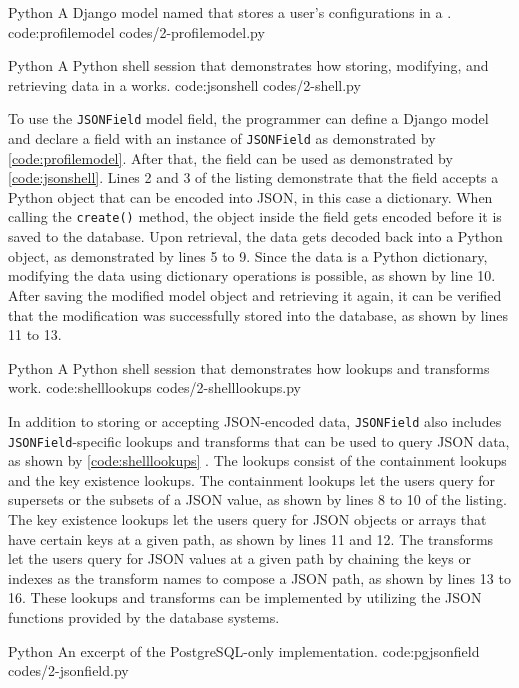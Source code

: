\listing
{Python}
{A Django model named  that stores a user's configurations in a
.}
{code:profilemodel}
{codes/2-profilemodel.py}

\listing
{Python}
{A Python shell session that demonstrates how storing, modifying, and
retrieving data in a  works.}
{code:jsonshell}
{codes/2-shell.py}

To use the \verb|JSONField| model field, the programmer can define a Django
model and declare a field with an instance of \verb|JSONField| as demonstrated
by \autoref{code:profilemodel}. After that, the field can be used as
demonstrated by \autoref{code:jsonshell}. Lines 2 and 3 of the listing
demonstrate that the field accepts a Python object that can be encoded into
JSON, in this case a dictionary. When calling the \verb|create()| method, the
object inside the field gets encoded before it is saved to the database. Upon
retrieval, the data gets decoded back into a Python object, as demonstrated by
lines 5 to 9. Since the data is a Python dictionary, modifying the data using
dictionary operations is possible, as shown by line 10. After saving the
modified model object and retrieving it again, it can be verified that the
modification was successfully stored into the database, as shown by lines 11 to
13.

\listing
{Python}
{A Python shell session that demonstrates how  lookups and
transforms work.}
{code:shelllookups}
{codes/2-shelllookups.py}

In addition to storing or accepting JSON-encoded data, \verb|JSONField| also
includes \verb|JSONField|-specific lookups and transforms that can be used to
query JSON data, as shown by \autoref{code:shelllookups}
\cite{django30_modeljsonfield}. The lookups consist of the containment
lookups and the key existence lookups. The containment lookups let the users
query for supersets or the subsets of a JSON value, as shown by lines 8 to 10
of the listing. The key existence lookups let the users query for JSON objects
or arrays that have certain keys at a given path, as shown by lines 11 and 12.
The transforms let the users query for JSON values at a given path by chaining
the keys or indexes as the transform names to compose a JSON path, as shown by
lines 13 to 16. These lookups and transforms can be implemented by utilizing
the JSON functions provided by the database systems.

\listing
{Python}
{An excerpt of the PostgreSQL-only  implementation.}
{code:pgjsonfield}
{codes/2-jsonfield.py}

